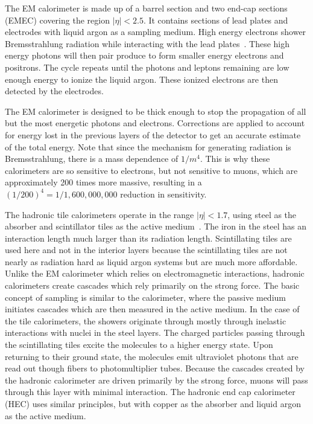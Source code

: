 
The EM calorimeter is made up of a barrel section and two end-cap sections (EMEC) covering the region $\left|\eta\right|< 2.5$. It contains sections of lead plates and electrodes with liquid argon as a sampling medium. High energy electrons shower Bremsstrahlung radiation while interacting with the lead plates~\cite{DETECTORS}. These high energy photons will then pair produce to form smaller energy electrons and positrons. The cycle repeats until the photons and leptons remaining are low enough energy to ionize the liquid argon. These ionized electrons are then detected by the electrodes. 

The EM calorimeter is designed to be thick enough to stop the propagation of all but the most energetic photons and electrons. Corrections are applied to account for energy lost in the previous layers of the detector to get an accurate estimate of the total energy. Note that since the mechanism for generating radiation is Bremsstrahlung, there is a mass dependence of $1/m^4$. This is why these calorimeters are so sensitive to electrons, but not sensitive to muons, which are approximately 200 times more massive, resulting in a $\left(1/200\right)^4=1/1,600,000,000$ reduction in sensitivity.

The hadronic tile calorimeters operate in the range $\left|\eta\right| < 1.7$, using steel as the absorber and scintillator tiles as the active medium~\cite{TILE}. The iron in the steel has an interaction length much larger than its radiation length. Scintillating tiles are used here and not in the interior layers because the scintillating tiles are not nearly as radiation hard as liquid argon systems but are much more affordable. Unlike the EM calorimeter which relies on electromagnetic interactions, hadronic calorimeters create cascades which rely primarily on the strong force. The basic concept of sampling is similar to the calorimeter, where the passive medium initiates cascades which are then measured in the active medium. In the case of the tile calorimeters, the showers originate through mostly through inelastic interactions with nuclei in the steel layers. The charged particles passing through the scintillating tiles excite the molecules to a higher energy state. Upon returning to their ground state, the molecules emit ultraviolet photons that are read out though fibers to photomultiplier tubes. Because the cascades created by the hadronic calorimeter are driven primarily by the strong force, muons will pass through this layer with minimal interaction. The hadronic end cap calorimeter (HEC) uses similar principles, but with copper as the absorber and liquid argon as the active medium.

